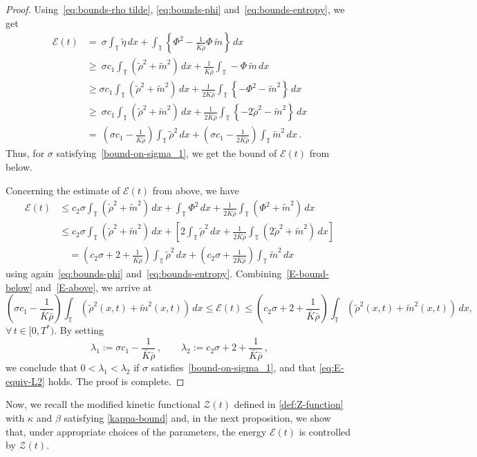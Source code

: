 \documentclass[10pt,reqno]{amsart}
\newcommand{\bbt} {\mathbb T}
\begin{document}
\begin{proof}
Using~\eqref{eq:bounds-rho tilde}, \eqref{eq:bounds-phi} and~\eqref{eq:bounds-entropy}, we get
\begin{align}\nonumber
    \mathcal{E}(t) & = ~\sigma\int_\bbt \tilde \eta\,dx + \int_\bbt \left\{ \Phi^2-\frac{1}{\bar K\bar\rho}\Phi \,\tilde  m\right\}\,dx \\ \nonumber
    &  \geq ~\sigma c_1\int_\bbt (\tilde \rho^2+\tilde  m^2)\,dx + \frac{1}{\bar K\bar\rho}\int_\bbt -\Phi \,\tilde  m\,dx \nonumber \\
    & \geq \sigma c_1\int_\bbt(\tilde \rho^2+\tilde  m^2)\,dx +\frac{1}{2\bar K\bar\rho}\int_\bbt \left\{-\Phi^2-\tilde  m^2 \right\}\,dx\\ \nonumber
    & \geq~ \sigma c_1\int_\bbt (\tilde \rho^2+\tilde  m^2)\,dx +\frac{1}{2\bar K\bar\rho}\int_\bbt \left\{-2\tilde \rho^2-\tilde  m^2\right\}\,dx\\ \label{E-bound-below}
    &= ~\left(\sigma c_1-\frac{1}{\bar K\bar\rho}\right)\int_\bbt \tilde \rho^2\,dx + \left(\sigma c_1-\frac{1}{2\bar K\bar\rho}\right)\int_\bbt \tilde m^2\,dx\,.
\end{align}
Thus, for $\sigma$ satisfying~\eqref{bound-on-sigma_1}, we get the bound of $\mathcal{E}(t)$ from below. 

Concerning the estimate of $\mathcal{E}(t)$ from above, we have
 \begin{align}
    \mathcal{E}(t) & \leq c_2\sigma\int_\bbt (\tilde \rho^2+\tilde m^2)\,dx +  \int_\bbt\Phi^2\,dx +\frac{1}{2\bar K\bar \rho}\int_\bbt (\Phi^2+\tilde m^2)\,dx \nonumber\\
    &\leq c_2\sigma\int_\bbt (\tilde \rho^2+\tilde m^2)\,dx + \left[ 2\int_\bbt\tilde \rho^2\,dx +\frac{1}{2\bar K\bar \rho}\int_\bbt (2\tilde \rho^2+\tilde m^2)\,dx\right] \nonumber\\
    &\quad = \left( c_2\sigma+2+\frac{1}{\bar K\bar\rho} \right)\int_\bbt \tilde \rho^2\,dx + \left( c_2\sigma+\frac{1}{2\bar K\bar\rho} \right)\int_\bbt \tilde m^2\,dx \label{E-above}
\end{align}
using again~\eqref{eq:bounds-phi} and~\eqref{eq:bounds-entropy}.
Combining~\eqref{E-bound-below} and~\eqref{E-above}, we arrive at
$$
\left(\sigma c_1-\frac{1}{\bar K\bar\rho}\right)\int_\bbt (\tilde \rho^2(x,t)+\tilde m^2(x,t) )\,dx 
\le \mathcal{E}(t)\le
\left( c_2\sigma+2+\frac{1}{\bar K\bar\rho} \right)\int_\bbt (\tilde \rho^2(x,t)+\tilde m^2(x,t))\,dx, 
$$
$\forall\, t\in[0,T^*)$.
By setting
\begin{equation*}
    \lambda_
1 :=\sigma c_1-\frac{1}{\bar K\bar\rho}\,,\qquad \lambda_
2:=c_2\sigma+2+\frac{1}{\bar K\bar\rho}\,,
\end{equation*}
we conclude that  
$0<\lambda_1<\lambda_2$ if $\sigma$ satisfies~\eqref{bound-on-sigma_1}, and that \eqref{eq:E-equiv-L2} holds. The proof is complete.
\end{proof}
Now, we recall the modified kinetic functional $\mathcal Z(t)$ defined in \eqref{def:Z-function}
with $\kappa$ and $\beta$ satisfying \eqref{kappa-bound} and, in the next proposition, we show that, under appropriate choices of the parameters, the energy $\mathcal E(t)$ is controlled by $\mathcal Z(t)$.
\end{document}
